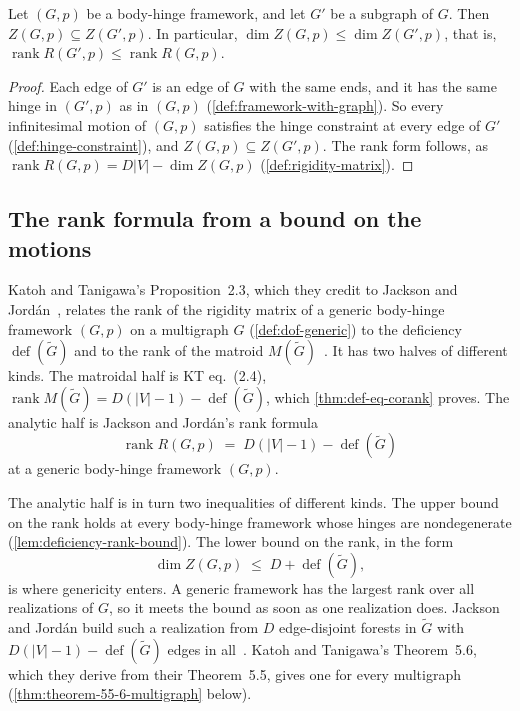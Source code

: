 \begin{lemma}
  \label{lem:motions-mono-of-graph-le}
  \leanok
  Let $(G,p)$ be a body-hinge framework, and let $G'$ be a subgraph of
  $G$. Then $Z(G,p) \subseteq Z(G',p)$. In particular,
  $\dim Z(G,p) \le \dim Z(G',p)$, that is,
  $\operatorname{rank} R(G',p) \le \operatorname{rank} R(G,p)$.
\end{lemma}
\begin{proof}
  \leanok
  Each edge of $G'$ is an edge of $G$ with the same ends, and it has the
  same hinge in $(G',p)$ as in $(G,p)$ (\cref{def:framework-with-graph}).
  So every infinitesimal motion of $(G,p)$ satisfies the hinge
  constraint at every edge of $G'$ (\cref{def:hinge-constraint}), and
  $Z(G,p) \subseteq Z(G',p)$. The rank form follows, as
  $\operatorname{rank} R(G,p) = D|V| - \dim Z(G,p)$
  (\cref{def:rigidity-matrix}).
\end{proof}

\subsection{The rank formula from a bound on the motions}
\label{sec:molecular-algebraic-induction-prop11}

Katoh and Tanigawa's Proposition~2.3, which they credit to Jackson and
Jord\'an~\cite{jacksonJordan2009}, relates the rank of the rigidity matrix
of a generic body-hinge framework $(G,p)$ on a multigraph $G$
(\cref{def:dof-generic}) to the deficiency $\operatorname{def}(\tilde G)$
and to the rank of the matroid
$M(\tilde G)$~\cite[p.~655]{katohTanigawa2011}. It has two halves of
different kinds. The matroidal half is KT eq.~(2.4),
$\operatorname{rank} M(\tilde G) = D(|V|-1) - \operatorname{def}(\tilde G)$,
which \cref{thm:def-eq-corank} proves. The analytic half is Jackson and
Jord\'an's rank formula~\cite[Theorem~6.1]{jacksonJordan2009}
\[
  \operatorname{rank} R(G,p) \;=\; D(|V|-1) - \operatorname{def}(\tilde G)
\]
at a generic body-hinge framework $(G,p)$.

The analytic half is in turn two inequalities of different kinds. The
upper bound on the rank holds at every body-hinge framework whose
hinges are nondegenerate (\cref{lem:deficiency-rank-bound}). The lower bound on the rank, in the
form
\[
  \dim Z(G,p) \;\le\; D + \operatorname{def}(\tilde G),
\]
is where genericity enters. A generic framework has the largest rank
over all realizations of $G$, so it meets the bound as soon as one
realization does. Jackson and Jord\'an build such a realization from
$D$ edge-disjoint forests in $\tilde G$ with
$D(|V|-1) - \operatorname{def}(\tilde G)$ edges in
all~\cite[Theorem~6.1]{jacksonJordan2009}. Katoh and Tanigawa's
Theorem~5.6, which they derive from their Theorem~5.5, gives one for
every multigraph~\cite[p.~670]{katohTanigawa2011}
(\cref{thm:theorem-55-6-multigraph} below).

